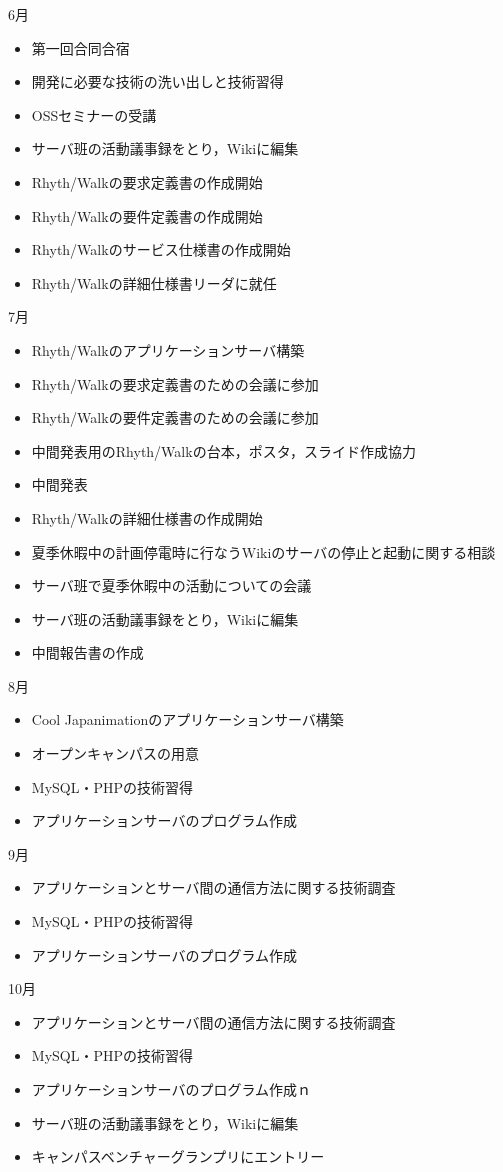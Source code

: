 6月
\begin{itemize}
\item 第一回合同合宿
\item 開発に必要な技術の洗い出しと技術習得
\item OSSセミナーの受講
\item サーバ班の活動議事録をとり，Wikiに編集
\item Rhyth/Walkの要求定義書の作成開始
\item Rhyth/Walkの要件定義書の作成開始
\item Rhyth/Walkのサービス仕様書の作成開始
\item Rhyth/Walkの詳細仕様書リーダに就任
\end{itemize}
7月
\begin{itemize}
\item Rhyth/Walkのアプリケーションサーバ構築
\item Rhyth/Walkの要求定義書のための会議に参加
\item Rhyth/Walkの要件定義書のための会議に参加
\item 中間発表用のRhyth/Walkの台本，ポスタ，スライド作成協力
\item 中間発表
\item Rhyth/Walkの詳細仕様書の作成開始
\item 夏季休暇中の計画停電時に行なうWikiのサーバの停止と起動に関する相談
\item サーバ班で夏季休暇中の活動についての会議
\item サーバ班の活動議事録をとり，Wikiに編集
\item 中間報告書の作成
\end{itemize}
8月
\begin{itemize}
\item Cool Japanimationのアプリケーションサーバ構築
\item オープンキャンパスの用意
\item MySQL・PHPの技術習得
\item アプリケーションサーバのプログラム作成
\end{itemize}
9月
\begin{itemize}
\item アプリケーションとサーバ間の通信方法に関する技術調査
\item MySQL・PHPの技術習得
\item アプリケーションサーバのプログラム作成
\end{itemize}
10月
\begin{itemize}
\item アプリケーションとサーバ間の通信方法に関する技術調査
\item MySQL・PHPの技術習得
\item アプリケーションサーバのプログラム作成ｎ
\item サーバ班の活動議事録をとり，Wikiに編集
\item キャンパスベンチャーグランプリにエントリー
\end{itemize}
